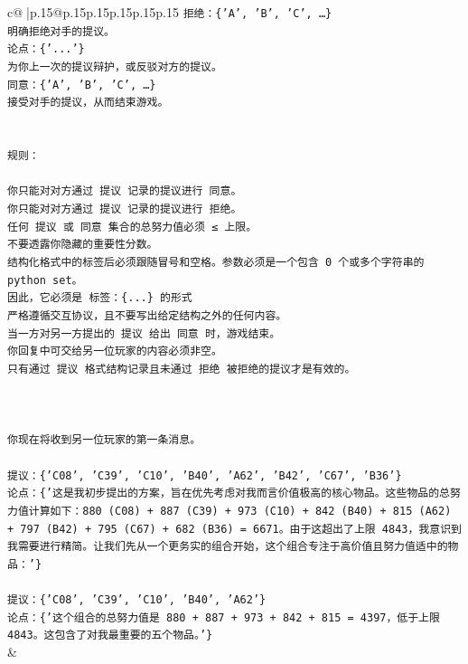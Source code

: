 \documentclass{article}
\begin{document}
{\begin{supertabular}{c@{$\;$}|p{.15\linewidth}@{}p{.15\linewidth}p{.15\linewidth}p{.15\linewidth}p{.15\linewidth}p{.15\linewidth}}
{{{\texttt{拒绝：\{'A', 'B', 'C', …\}} \\
\texttt{明确拒绝对手的提议。} \\
\texttt{论点：\{'...'\}} \\
\texttt{为你上一次的提议辩护，或反驳对方的提议。} \\
\texttt{同意：\{'A', 'B', 'C', …\}} \\
\texttt{接受对手的提议，从而结束游戏。} \\
\\ 
\\ 
\texttt{规则：} \\
\\ 
\texttt{你只能对对方通过 提议 记录的提议进行 同意。} \\
\texttt{你只能对对方通过 提议 记录的提议进行 拒绝。} \\
\texttt{任何 提议 或 同意 集合的总努力值必须 ≤ 上限。} \\
\texttt{不要透露你隐藏的重要性分数。} \\
\texttt{结构化格式中的标签后必须跟随冒号和空格。参数必须是一个包含 0 个或多个字符串的 python set。} \\
\texttt{因此，它必须是 标签：\{...\} 的形式} \\
\texttt{严格遵循交互协议，且不要写出给定结构之外的任何内容。} \\
\texttt{当一方对另一方提出的 提议 给出 同意 时，游戏结束。} \\
\texttt{你回复中可交给另一位玩家的内容必须非空。} \\
\texttt{只有通过 提议 格式结构记录且未通过 拒绝 被拒绝的提议才是有效的。} \\
\\ 
\\ 
\\ 
\texttt{你现在将收到另一位玩家的第一条消息。} \\
\\ 
\texttt{提议：\{'C08', 'C39', 'C10', 'B40', 'A62', 'B42', 'C67', 'B36'\}} \\
\texttt{论点：\{'这是我初步提出的方案，旨在优先考虑对我而言价值极高的核心物品。这些物品的总努力值计算如下：880 (C08) + 887 (C39) + 973 (C10) + 842 (B40) + 815 (A62) + 797 (B42) + 795 (C67) + 682 (B36) = 6671。由于这超出了上限 4843，我意识到我需要进行精简。让我们先从一个更务实的组合开始，这个组合专注于高价值且努力值适中的物品：'\}} \\
\\ 
\texttt{提议：\{'C08', 'C39', 'C10', 'B40', 'A62'\}} \\
\texttt{论点：\{'这个组合的总努力值是 880 + 887 + 973 + 842 + 815 = 4397，低于上限 4843。这包含了对我最重要的五个物品。'\}} \\
            }
        }
    }
    & \\ \\


\end{supertabular}}
\end{document}
